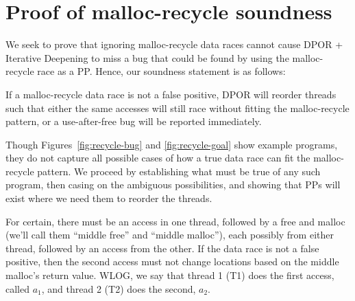 \section{Proof of malloc-recycle soundness}
\label{sec:proof}

We seek to prove that ignoring malloc-recycle data races cannot cause DPOR + Iterative Deepening to miss a bug that could be found by using the malloc-recycle race as a PP. Hence, our soundness statement is as follows:

\begin{theorem}
	If a malloc-recycle data race is not a false positive, DPOR will reorder threads such that either the same accesses will still race without fitting the malloc-recycle pattern, or a use-after-free bug will be reported immediately.
\end{theorem}

Though Figures~\ref{fig:recycle-bug} and \ref{fig:recycle-goal} show example programs, they do not capture all possible cases of how a true data race can fit the malloc-recycle pattern.
We proceed by establishing what must be true of any such program, then casing on the ambiguous possibilities, and showing that PPs will exist where we need them to reorder the threads.

For certain, there must be an access in one thread, followed by a free and malloc (we'll call them ``middle free'' and ``middle malloc''), each possibly from either thread, followed by an access from the other.
If the data race is not a false positive, then the second access must not change locations based on the middle malloc's return value.
WLOG, we say that thread 1 (T1) does the first access, called $a_1$, and thread 2 (T2) does the second, $a_2$.

